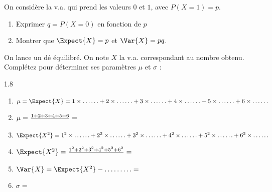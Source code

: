 \documentclass[main.tex]{subfiles}
\begin{document}
\begin{exercise} On considère la v.a. qui prend les valeurs $0$ et $1$, avec $P(X=1)=p$.
	\begin{enumerate}[label={\arabic*)},leftmargin=*]  
		\item Exprimer $q=P(X=0)$ en fonction de $p$
		\item Montrer que $\Expect{X}=p$ et   $\Var{X}=pq$. 
	\end{enumerate}
\end{exercise}
\begin{exercise} On lance un dé équilibré. On note $X$ la v.a. correspondant au nombre obtenu. Complétez pour déterminer ses paramètres $\mu$ et $\sigma$ :
	\vspace{-0.5em}
	\begin{spacing}{1.8}
		\begin{enumerate}[label={},leftmargin=*]  
			\item  $\mu=\Expect{X}=1\times \ldots\ldots+2\times \ldots\ldots+3\times \ldots\ldots+4\times \ldots\ldots+5\times \ldots\ldots+6\times \ldots\ldots$
			\item $\mu=\frac{1+2+3+4+5+6}{\qquad}=\dotfill $
			\item $\Expect{X^2}=1^2\times \ldots\ldots+2^2\times \ldots\ldots+3^2\times \ldots\ldots+4^2\times \ldots\ldots+5^2\times \ldots\ldots+6^2\times \ldots\ldots$
			\item $\Expect{X^2}=\frac{1^2+2^2+3^2+4^2+5^2+6^2}{\qquad}=\dotfill $
			\item $\Var{X}=\Expect{X^2}-\ldots\ldots\ldots = \dotfill$
			\item $\sigma=$\dotfill
		\end{enumerate}
	\end{spacing} 
\end{exercise} 
\vspace{-1em} 
\end{document}
